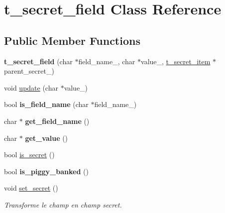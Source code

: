 \hypertarget{classt__secret__field}{}\section{t\+\_\+secret\+\_\+field Class Reference}
\label{classt__secret__field}
\subsection*{Public Member Functions}
\begin{DoxyCompactItemize}
\item 
\mbox{\label{classt__secret__field_a6bd506f8e8596f135f50203687335b2a}} 
{\bfseries t\+\_\+secret\+\_\+field} (char $\ast$field\+\_\+name\+\_\+, char $\ast$value\+\_\+, \hyperlink{classt__secret__item}{t\+\_\+secret\+\_\+item} $\ast$parent\+\_\+secret\+\_\+)
\item 
void \hyperlink{classt__secret__field_ae5d2d9cd45e310e33ccf9d3cc8da8bb1}{update} (char $\ast$value\+\_\+)
\item 
\mbox{\label{classt__secret__field_aa34d03ac7de5d0887cc836260ba0f383}} 
bool {\bfseries is\+\_\+field\+\_\+name} (char $\ast$field\+\_\+name\+\_\+)
\item 
\mbox{\label{classt__secret__field_a39bbadaf1e45866d55c08b7e672e30f0}} 
char $\ast$ {\bfseries get\+\_\+field\+\_\+name} ()
\item 
\mbox{\label{classt__secret__field_af44bf11dccb3a67fdcf26eca856a790c}} 
char $\ast$ {\bfseries get\+\_\+value} ()
\item 
bool \hyperlink{classt__secret__field_a5c3a67f7ac958289fa55dcdede86f141}{is\+\_\+secret} ()
\item 
\mbox{\label{classt__secret__field_a14b5750e5f679694a8829b73419915c2}} 
bool {\bfseries is\+\_\+piggy\+\_\+banked} ()
\item 
void \hyperlink{classt__secret__field_abc856f06a23fdb25a86e50f49b37e238}{set\+\_\+secret} ()
\begin{DoxyCompactList}\small\item\em Transforme le champ en champ secret. \end{DoxyCompactList}\item 

\end{DoxyCompactItemize}
